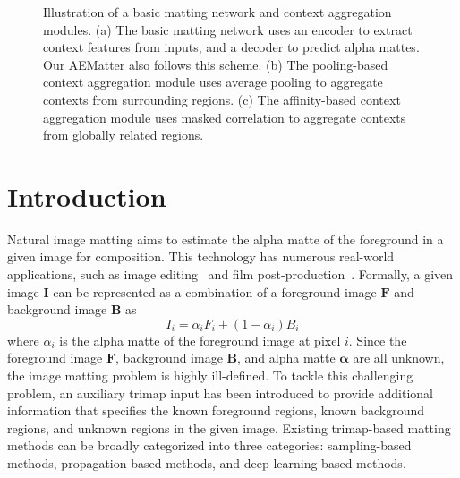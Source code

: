 \documentclass[10pt,twocolumn,letterpaper]{article}
\begin{document}
\begin{figure}[!t]
    \begin{center}
\vspace{-1pt}
\vspace{-1pt}
\vspace{-1pt}
    \end{center}
    \caption{Illustration of a basic matting network and context aggregation modules. (a) The basic matting network uses an encoder to extract context features from inputs, and a decoder to predict alpha mattes. Our AEMatter also follows this scheme. (b) The pooling-based context aggregation module uses average pooling to aggregate contexts from  surrounding regions. (c) The affinity-based context aggregation module uses masked correlation to aggregate contexts from globally related regions.}
\label{fig:overs}
\end{figure}




\section{Introduction}
\label{sec:intro}
Natural image matting aims to estimate the alpha matte of the foreground in a given image for composition.
This technology has numerous real-world applications, such as image editing~\cite{2009Sketch2Photo,2017Robust} and film post-production~\cite{2015Integrated,Wang_2021_ICCV}. Formally, a given image $\bm{I}$ can be represented as a combination of a foreground image $\bm{F}$ and background image $\bm{B}$ as
\begin{equation}
\label{sca}
{{I}}_i = {\alpha}_i {F}_i + (1-{ \alpha}_i ){B}_i 
\end{equation}
where ${\alpha}_i$ is the alpha matte of the foreground image at pixel $i$.
Since the foreground image $\bm{F}$, background image $\bm{B}$, and alpha matte $\bm{\alpha}$ are all unknown, the image matting problem is highly ill-defined.
To tackle this challenging problem, an auxiliary trimap input has been introduced to provide additional information that specifies the known foreground regions, known background regions, and unknown regions in the given image. 
Existing trimap-based matting methods can be broadly categorized into three categories: sampling-based methods, propagation-based methods, and deep learning-based methods.
\end{document}
